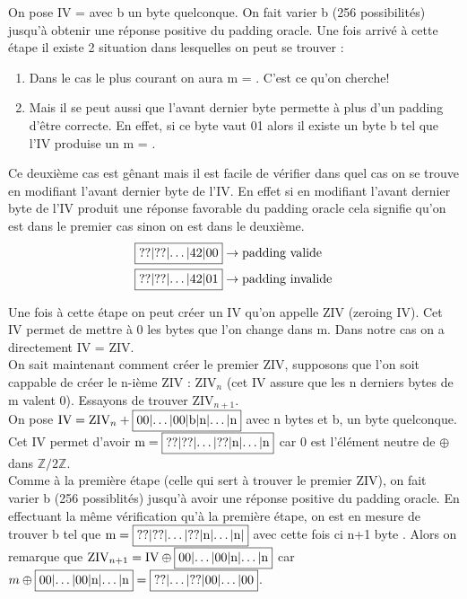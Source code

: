 \documentclass[a4paper, 12pt]{article}
\begin{document}
On pose IV =  avec b un byte quelconque. On fait varier b (256 possibilités) jusqu'à obtenir une réponse positive du padding oracle. Une fois arrivé à cette étape il existe 2 situation dans lesquelles on peut se trouver :

\begin{enumerate}
	\item Dans le cas le plus courant on aura m = . C'est ce qu'on cherche!
	\item Mais il se peut aussi que l'avant dernier byte permette à plus d'un padding d'être correcte. En effet, si ce byte vaut 01 alors il existe un byte b tel que l'IV produise un m = .
\end{enumerate}

Ce deuxième cas est gênant mais il est facile de vérifier dans quel cas on se trouve en modifiant l'avant dernier byte de l'IV.
En effet si en modifiant l'avant dernier byte de l'IV produit une réponse favorable du padding oracle cela signifie qu'on est dans le premier cas sinon on est dans le deuxième. 
\begin{align*}
	&\fbox{??|??|$\dots$|42|00} \rightarrow \text{padding valide}\\
	&\fbox{??|??|$\dots$|42|01} \rightarrow \text{padding invalide}
\end{align*}

Une fois à cette étape on peut créer un IV qu'on appelle ZIV (zeroing IV). Cet IV permet de mettre à 0 les bytes que l'on change dans m. Dans notre cas on a directement IV = ZIV. \\

On sait maintenant comment créer le premier ZIV, supposons que l'on soit cappable de créer le n-ième ZIV : $\text{ZIV}_n$ (cet IV assure que les n derniers bytes de m valent 0). Essayons de trouver $\text{ZIV}_{n+1}$. \\

On pose $\text{IV} = \text{ZIV}_n + \fbox{00|$\dots$|00|b|n|$\dots$|n}$ avec n bytes  et b, un byte quelconque. Cet IV permet d'avoir $\text{m} = \fbox{??|??|\dots|??|n|$\dots$|n}$ car 0 est l'élément neutre de $\oplus$ dans $\mathbb{Z}/2\mathbb{Z}$. \\
Comme à la première étape (celle qui sert à trouver le premier ZIV), on fait varier b (256 possiblités) jusqu'à avoir une réponse positive du padding oracle. En effectuant la même vérification qu'à la première étape, on est en mesure de trouver b tel que $\text{m} = \fbox{??|??|$\dots$|??|n|$\dots$|n|}$ avec cette fois ci n+1 byte . Alors on remarque que $\text{ZIV}_{n+1} = \text{IV} \oplus \fbox{00|$\dots$|00|n|$\dots$|n}$ car $m \oplus \fbox{00|$\dots$|00|n|$\dots$|n} = \fbox{??|$\dots$|??|00|$\dots$|00}$. \\
\end{document}

